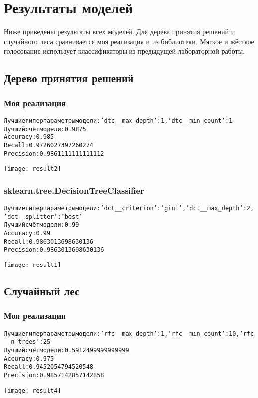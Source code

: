 \graphicspath{{images/}}
\section{Результаты моделей}
Ниже приведены результаты всех моделей. Для дерева принятия решений и случайного леса сравнивается моя реализация и из библиотеки. Мягкое и жёсткое голосование использует классификаторы из предыдущей лабораторной работы.

\subsection{Дерево принятия решений}
\subsubsection{Моя реализация}
\begin{alltt}
Лучшие гиперпараметры модели: {'dtc__max_depth': 1, 'dtc__min_count': 1}
Лучший счёт модели: 0.9875
Accuracy: 0.985
Recall: 0.9726027397260274
Precision: 0.9861111111111112
\end{alltt}
\begin{center}
\texttt{[image: result2]}
\end{center}
\pagebreak

\subsubsection{sklearn.tree.DecisionTreeClassifier}
\begin{alltt}
Лучшие гиперпараметры модели: {'dct__criterion': 'gini', 'dct__max_depth': 2, 'dct__splitter': 'best'}
Лучший счёт модели: 0.99
Accuracy: 0.99
Recall: 0.9863013698630136
Precision: 0.9863013698630136
\end{alltt}
\begin{center}
\texttt{[image: result1]}
\end{center}
\pagebreak

\subsection{Случайный лес}
\subsubsection{Моя реализация}
\begin{alltt}
Лучшие гиперпараметры модели: {'rfc__max_depth': 1, 'rfc__min_count': 10, 'rfc__n_trees': 25}
Лучший счёт модели: 0.5912499999999999
Accuracy: 0.975
Recall: 0.9452054794520548
Precision: 0.9857142857142858
\end{alltt}
\begin{center}
\texttt{[image: result4]}
\end{center}

